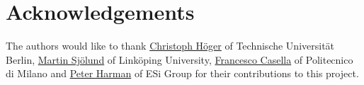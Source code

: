 \documentclass[11pt,a4paper,twocolumn]{article}
\renewcommand{\normalsize}{\fontsize{10.5pt}{12.3pt}\selectfont}
\renewcommand{\small}{\fontsize{9.5pt}{11.1pt}\selectfont}
\begin{document}
\section{Acknowledgements}
\label{sec:acknowledgements}

The authors would like to thank
\href{mailto:christoph.hoeger@tu-berlin.de}{Christoph H\"oger} of
Technische Universit\"at Berlin,
\href{mailto:martin.sjolund@liu.se}{Martin Sj\"olund} of Link\"oping
University, \href{mailto:francesco.casella@polimi.it}{Francesco Casella}
of Politecnico di Milano and \href{mailto:Peter.Harman@esi-group.com}
{Peter Harman} of ESi Group for their contributions to this project.

\small
\printbibliography%
\normalsize
\end{document}

